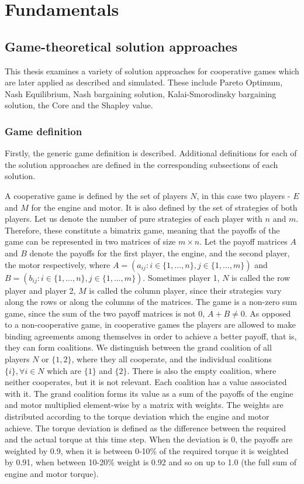\chapter{Fundamentals}
\label{chp:basics}

\section{Game-theoretical solution approaches}
This thesis examines a variety of solution approaches for cooperative games which are later applied as described and simulated. These include Pareto Optimum, Nash Equilibrium, Nash bargaining solution, Kalai-Smorodinsky bargaining solution, the Core and the Shapley value.

\subsection{Game definition}
Firstly, the generic game definition is described. Additional definitions for each of the solution approaches are defined in the corresponding subsections of each solution.

A cooperative game is defined by the set of players $N$, in this case two players - $E$ and $M$ for the engine and motor. It is also defined by the set of strategies of both players. Let us denote the number of pure strategies of each player with $n$ and $m$. Therefore, these constitute a bimatrix game, meaning that the payoffs of the game can be represented in two matrices of size $m \times n$. Let the payoff matrices $A$ and $B$ denote the payoffs for the first player, the engine, and the second player, the motor respectively, where $A = (a_{ij}: i \in \{1,...,n\}, j \in \{ 1,...,m\})$ and $B = (b_{ij}: i \in \{1,...,n\}, j \in \{ 1,...,m\})$. Sometimes player 1, $N$ is called  the row player and player 2, $M$ is called the column player, since their strategies vary along the rows or along the columns of the matrices. The game is a non-zero sum game, since the sum of the two payoff matrices is not 0, $A + B \neq 0$.
As opposed to a non-cooperative game, in cooperative games the players are allowed to make binding agreements among themselves in order to achieve a better payoff, that is, they can form coalitions. We distinguish between the grand coalition of all players $N$ or $\{1,2\}$, where they all cooperate, and the individual coalitions $\{i\}, \forall i \in N$ which are $\{1\}$ and $\{2\}$. There is also the empty coalition, where neither cooperates, but it is not relevant. Each coalition has a value associated with it. The grand coalition forms its value as a sum of the payoffs of the engine and motor multiplied element-wise by a matrix with weights. The weights are distributed according to the torque deviation which the engine and motor achieve. The torque deviation is defined as the difference between the required and the actual torque at this time step. When the deviation is 0, the payoffs are weighted by 0.9, when it is between 0-10\% of the required torque it is weighted by 0.91, when between 10-20\% weight is 0.92 and so on up to 1.0 (the full sum of engine and motor torque).


